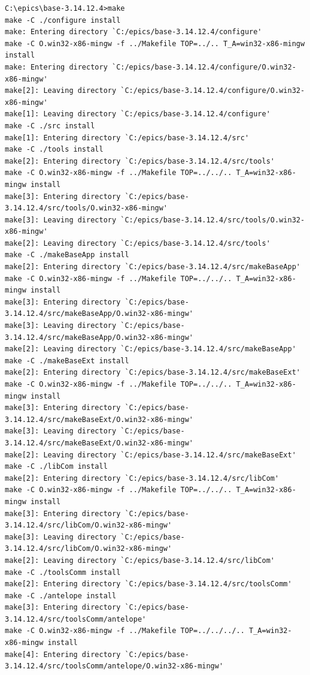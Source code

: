 \documentclass[11pt
  , a4paper
  , article
  , oneside
]{memoir}
\begin{document}
\begin{lstlisting}[style=termstyle]
C:\epics\base-3.14.12.4>make
make -C ./configure install
make: Entering directory `C:/epics/base-3.14.12.4/configure'
make -C O.win32-x86-mingw -f ../Makefile TOP=../.. T_A=win32-x86-mingw install
make: Entering directory `C:/epics/base-3.14.12.4/configure/O.win32-x86-mingw'
make[2]: Leaving directory `C:/epics/base-3.14.12.4/configure/O.win32-x86-mingw'
make[1]: Leaving directory `C:/epics/base-3.14.12.4/configure'
make -C ./src install
make[1]: Entering directory `C:/epics/base-3.14.12.4/src'
make -C ./tools install
make[2]: Entering directory `C:/epics/base-3.14.12.4/src/tools'
make -C O.win32-x86-mingw -f ../Makefile TOP=../../.. T_A=win32-x86-mingw install
make[3]: Entering directory `C:/epics/base-3.14.12.4/src/tools/O.win32-x86-mingw'
make[3]: Leaving directory `C:/epics/base-3.14.12.4/src/tools/O.win32-x86-mingw'
make[2]: Leaving directory `C:/epics/base-3.14.12.4/src/tools'
make -C ./makeBaseApp install
make[2]: Entering directory `C:/epics/base-3.14.12.4/src/makeBaseApp'
make -C O.win32-x86-mingw -f ../Makefile TOP=../../.. T_A=win32-x86-mingw install
make[3]: Entering directory `C:/epics/base-3.14.12.4/src/makeBaseApp/O.win32-x86-mingw'
make[3]: Leaving directory `C:/epics/base-3.14.12.4/src/makeBaseApp/O.win32-x86-mingw'
make[2]: Leaving directory `C:/epics/base-3.14.12.4/src/makeBaseApp'
make -C ./makeBaseExt install
make[2]: Entering directory `C:/epics/base-3.14.12.4/src/makeBaseExt'
make -C O.win32-x86-mingw -f ../Makefile TOP=../../.. T_A=win32-x86-mingw install
make[3]: Entering directory `C:/epics/base-3.14.12.4/src/makeBaseExt/O.win32-x86-mingw'
make[3]: Leaving directory `C:/epics/base-3.14.12.4/src/makeBaseExt/O.win32-x86-mingw'
make[2]: Leaving directory `C:/epics/base-3.14.12.4/src/makeBaseExt'
make -C ./libCom install
make[2]: Entering directory `C:/epics/base-3.14.12.4/src/libCom'
make -C O.win32-x86-mingw -f ../Makefile TOP=../../.. T_A=win32-x86-mingw install
make[3]: Entering directory `C:/epics/base-3.14.12.4/src/libCom/O.win32-x86-mingw'
make[3]: Leaving directory `C:/epics/base-3.14.12.4/src/libCom/O.win32-x86-mingw'
make[2]: Leaving directory `C:/epics/base-3.14.12.4/src/libCom'
make -C ./toolsComm install
make[2]: Entering directory `C:/epics/base-3.14.12.4/src/toolsComm'
make -C ./antelope install
make[3]: Entering directory `C:/epics/base-3.14.12.4/src/toolsComm/antelope'
make -C O.win32-x86-mingw -f ../Makefile TOP=../../../.. T_A=win32-x86-mingw install
make[4]: Entering directory `C:/epics/base-3.14.12.4/src/toolsComm/antelope/O.win32-x86-mingw'

\end{lstlisting}
\end{document}
